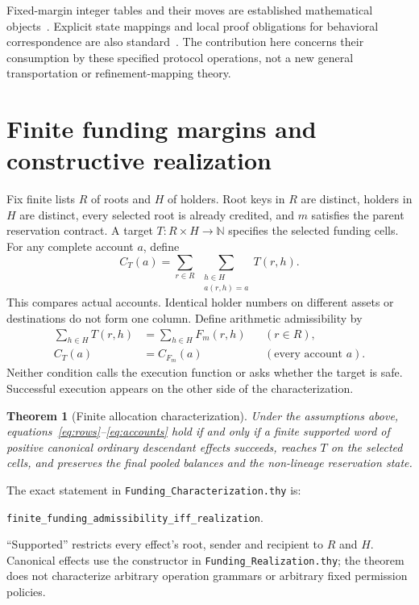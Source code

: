 \documentclass[10pt,a4paper]{article}
\newtheorem{theorem}{Theorem}
\newcommand{\code}[1]{\nolinkurl{#1}}
\newcommand{\source}[1]{\code{#1.thy}}
\newcommand{\Nat}{\mathbb{N}}
\begin{document}
Fixed-margin integer tables and their moves are established mathematical
objects~\cite{diaconisSturmfels1998}. Explicit state mappings and local proof
obligations for behavioral correspondence are also standard~\cite{abadiLamport1991}.
The contribution here concerns their consumption by these specified protocol
operations, not a new general transportation or refinement-mapping theory.

\clearpage
\section{Finite funding margins and constructive realization}
Fix finite lists $R$ of roots and $H$ of holders. Root keys in $R$ are distinct,
holders in $H$ are distinct, every selected root is already credited, and $m$
satisfies the parent reservation contract. A target $T:R\times H\to\Nat$
specifies the selected funding cells. For any complete account $a$, define
\[
 C_T(a)=\sum_{r\in R}\ \sum_{\substack{h\in H\\a(r,h)=a}} T(r,h).
\]
This compares actual accounts. Identical holder numbers on different assets
or destinations do not form one column. Define arithmetic admissibility by
\begin{align}
 \sum_{h\in H}T(r,h)&=\sum_{h\in H}F_m(r,h) &&(r\in R),\label{eq:rows}\\
 C_T(a)&=C_{F_m}(a) &&(\text{every account }a).\label{eq:accounts}
\end{align}
Neither condition calls the execution function or asks whether the target is
safe. Successful execution appears on the other side of the characterization.

\begin{theorem}[Finite allocation characterization]
Under the assumptions above, equations~\eqref{eq:rows}--\eqref{eq:accounts}
hold if and only if a finite supported word of positive canonical ordinary
descendant effects succeeds, reaches $T$ on the selected cells, and preserves
the final pooled balances and the non-lineage reservation state.
\end{theorem}

The exact statement in \source{Funding_Characterization} is:
\par\code{finite_funding_admissibility_iff_realization}.\par
``Supported'' restricts every effect's
root, sender and recipient to $R$ and $H$. Canonical effects use the constructor
in \source{Funding_Realization}; the theorem does not characterize arbitrary
operation grammars or arbitrary fixed permission policies.
\end{document}
